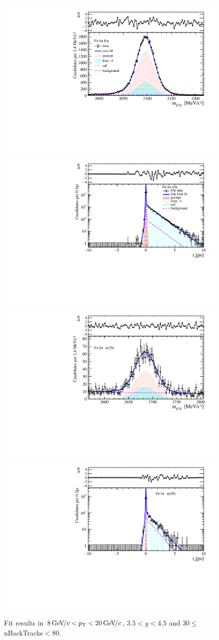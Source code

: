 \begin{figure}[H]
\begin{center}
\includegraphics[width=0.47\linewidth]{pdf/Jpsi/drawmassB/n5y3pt5.pdf}
\includegraphics[width=0.47\linewidth]{pdf/Jpsi/2DFitB/n5y3pt5.pdf}
\vspace*{-0.5cm}
\includegraphics[width=0.47\linewidth]{pdf/Psi2S/drawmassB/n5y3pt5.pdf}
\includegraphics[width=0.47\linewidth]{pdf/Psi2S/2DFitB/n5y3pt5.pdf}
\vspace*{-0.5cm}
\end{center}
\caption{Fit results in $8\text{\,Ge\kern -0.1em V\!/}c<p_{\mathrm{T}}<20\text{\,Ge\kern -0.1em V\!/}c$, $3.5<y<4.5$ and 30$\leq$nBackTracks$<$80.}
\label{Fitn5y3pt5}
\end{figure}
